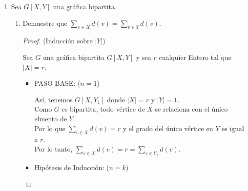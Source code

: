 \documentclass{article}
\begin{document}
\begin{enumerate}
\begin{enumerate}
\begin{proof}
        Ahora notemos que, en $Y$ están todos los subconjuntos de
        $BL_n$  que tienen cardinalidad impar. Por lo tanto, la
        diferencia simétrica en cualesquiera dos subconjuntos
        distintos en $Y$ es:
        \begin{itemize}
        \item[-] Al menos un conjunto de cardinalidad $2$.
        \end{itemize}
        Entonces tenemos que: $2k + 1 - (2k -1) = 2$ y como $Y$
        es un conjunto, no se tiene dos conjuntos iguales a los
        cuales relacionar. Por lo anterior y por la definición de
        diferencia simétrica, no existen dos conjuntos adyacentes
        en $Y$.

        \hspace*{3cm}  $\therefore$ \ \ \ $BL_n$ es bipartita en $X$ y $Y$, \textit{i.e.} $BL_n[X,Y]$
      \end{proof}
    \end{enumerate}

  \item Sea $G[X, Y]$ una gr\'afica bipartita.
    \begin{enumerate}

      \item Demuestre que $\sum_{v \in X} d(v) = \sum_{v \in Y} d(v)$.
      \begin{proof}
        (Inducción sobre ${|Y|}$)

        Sea $G$ una gr\'afica bipartita $G[X,Y]$ y sea $r$ cualquier Entero tal que $|X|=r$.
        \begin{itemize}
          \item PASO BASE: ($n=1$)

            As\'i, tenemos $G[X,Y_{1}]$ donde $|X|=r$ y $|Y|=1$. \\
            Como $G$ es bipartita, todo v\'ertice de $X$ se relaciona con el \'unico elmento
            de $Y$. \\
            Por lo que $\sum_{v \in X}d(v) = r$ y el grado del \'unico v\'ertice
            en $Y$ es igual a $r$. \\
            Por lo tanto, $\sum_{v \in X}d(v) = r = \sum_{v \in Y_1}d(v)$. \\

          \item Hip\'otesis de Inducci\'on: ($n=k$)


\end{itemize}
\end{proof}
\end{enumerate}
\end{enumerate}
\end{document}
